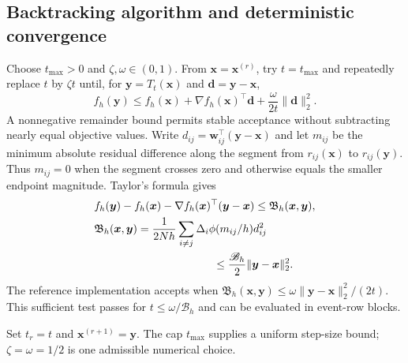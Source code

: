 \subsection{Backtracking algorithm and deterministic convergence}
\label{subsec:comp-algorithm}
Choose $t_{\max}>0$ and $\zeta,\omega\in(0,1)$. From $\bm{x}=\bm{x}^{(r)}$, try $t=t_{\max}$ and repeatedly replace $t$ by $\zeta t$ until, for $\bm{y}=T_t(\bm{x})$ and $\bm{d}=\bm{y}-\bm{x}$,
\begin{equation}
 f_h(\bm{y})\le f_h(\bm{x})+\nabla f_h(\bm{x})^\top \bm{d}+
                       \frac{\omega}{2t}\|\bm{d}\|_2^2.
 \label{eq:comp-backtracking}
\end{equation}
A nonnegative remainder bound permits stable acceptance without subtracting nearly equal objective values. Write $d_{ij}=\bm{w}_{ij}^\top(\bm{y}-\bm{x})$ and let $m_{ij}$ be the minimum absolute residual difference along the segment from $r_{ij}(\bm{x})$ to $r_{ij}(\bm{y})$. Thus $m_{ij}=0$ when the segment crosses zero and otherwise equals the smaller endpoint magnitude. Taylor's formula gives
\begin{equation}
\begin{aligned}
&f_h(\bm y)-f_h(\bm x)-\nabla f_h(\bm x)^\top(\bm y-\bm x)
 \le\mathfrak B_h(\bm x,\bm y),\\
&\mathfrak B_h(\bm x,\bm y)=
 \frac1{2Nh}\sum_{i\ne j}\Delta_i\phi(m_{ij}/h)d_{ij}^2\\
&\hspace{38mm}\le\frac{\mathscr B_h}{2}\|\bm y-\bm x\|_2^2.
\end{aligned}
\label{eq:comp-positive-certificate}
\end{equation}
The reference implementation accepts when $\mathfrak B_h(\bm{x},\bm{y})\le\omega\|\bm{y}-\bm{x}\|_2^2/(2t)$. This sufficient test passes for $t\le\omega/\mathscr B_h$ and can be evaluated in event-row blocks.

Set $t_r=t$ and $\bm{x}^{(r+1)}=\bm{y}$. The cap $t_{\max}$ supplies a uniform step-size bound; $\zeta=\omega=1/2$ is one admissible numerical choice.

